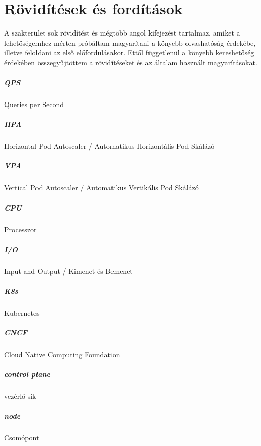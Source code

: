\chapter{Rövidítések és fordítások}
\label{sec:abbreviations}

A szakterület sok rövidítést és mégtöbb angol kifejezést tartalmaz, amiket a lehetőségemhez mérten próbáltam magyarítani a könyebb olvashatóság érdekébe, illetve feloldani az első előfordulásakor.
Ettől függetlenül a könyebb kereshetőség érdekében összegyűjtöttem a rövidítéseket és az általam használt magyarításokat.

\paragraph{QPS} Queries per Second
\paragraph{HPA} Horizontal Pod Autoscaler / Automatikus Horizontális Pod Skálázó
\paragraph{VPA} Vertical Pod Autoscaler / Automatikus Vertikális Pod Skálázó
\paragraph{CPU} Processzor
\paragraph{I/O} Input and Output / Kimenet és Bemenet
\paragraph{K8s} Kubernetes
\paragraph{CNCF} Cloud Native Computing Foundation
\paragraph{control plane} vezérlő sík
\paragraph{node} Csomópont
